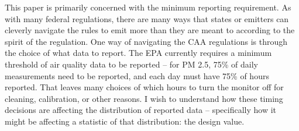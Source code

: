This paper is primarily concerned with the minimum reporting requirement. As with many federal regulations, there are many ways that states or emitters can cleverly navigate the rules to emit more than they are meant to according to the spirit of the regulation. One way of navigating the CAA regulations is through the choice of what data to report. The EPA currently requires a minimum threshold of air quality data to be reported -- for PM 2.5, 75\% of daily measurements need to be reported, and each day must have 75\% of hours reported. That leaves many choices of which hours to turn the monitor off for cleaning, calibration, or other reasons. I wish to understand how these timing decisions are affecting the distribution of reported data -- specifically how it might be affecting a statistic of that distribution: the design value.